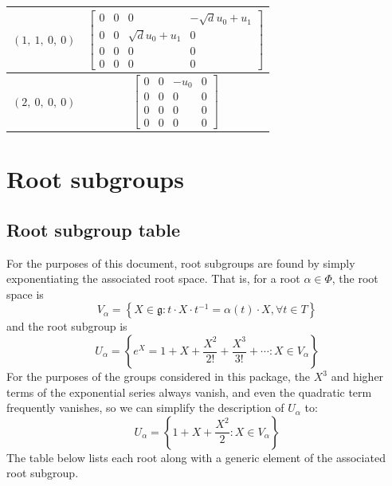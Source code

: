 \documentclass[11pt]{article}
\newcommand{\noi}{\noindent}
\newcommand{\inv}{^{-1}}
\newcommand{\lb}{\left\{}
\newcommand{\rb}{\right\}}
\newcommand{\frakg}{\mathfrak{g}}
\theoremstyle{definition}
\begin{document}
\begin{longtable}{|l|c|}
    \hline
    $\left( 1, \  1, \  0, \  0\right)$ & ${\left[\begin{matrix}0 & 0 & 0 & - \sqrt{d} u_{0} + u_{1}\\0 & 0 & \sqrt{d} u_{0} + u_{1} & 0\\0 & 0 & 0 & 0\\0 & 0 & 0 & 0\end{matrix}\right]}$ \\
    \hline
    $\left( 2, \  0, \  0, \  0\right)$ & ${\left[\begin{matrix}0 & 0 & - u_{0} & 0\\0 & 0 & 0 & 0\\0 & 0 & 0 & 0\\0 & 0 & 0 & 0\end{matrix}\right]}$ \\
    \hline
\end{longtable}


\newpage
\section{Root subgroups}

\subsection{Root subgroup table}

\noi For the purposes of this document, root subgroups are found by simply exponentiating the associated root space. That is, for a root $\alpha \in \Phi$, the root space is
\[
	V_\alpha = \lb X \in \frakg : t \cdot X \cdot t \inv = \alpha(t) \cdot X, \forall t \in T \rb
\]
and the root subgroup is
\[
	U_\alpha = \lb e^X = 1 + X + \frac{X^2}{2!} + \frac{X^3}{3!} + \cdots : X \in V_\alpha \rb
\]
For the purposes of the groups considered in this package, the $X^3$ and higher terms of the exponential series always vanish, and even the quadratic term frequently vanishes, so we can simplify the description of $U_\alpha$ to:
\[
	U_\alpha = \lb 1 + X + \frac{X^2}{2} : X \in V_\alpha \rb
\]
The table below lists each root along with a generic element of the associated root subgroup.
\end{document}

